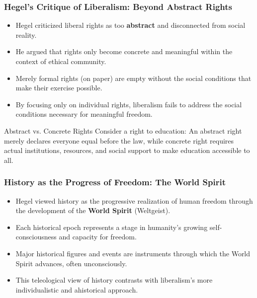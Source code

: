 \documentclass{beamer}
\begin{document}
\begin{frame}
\frametitle{Hegel's Critique of Liberalism: Beyond Abstract Rights}
\begin{itemize}
    \item Hegel criticized liberal rights as too \textbf{abstract} and disconnected from social reality.
    \item He argued that rights only become concrete and meaningful within the context of ethical community.
    \item Merely formal rights (on paper) are empty without the social conditions that make their exercise possible.
    \item By focusing only on individual rights, liberalism fails to address the social conditions necessary for meaningful freedom.
\end{itemize}

\begin{block}{Abstract vs. Concrete Rights}
Consider a right to education: An abstract right merely declares everyone equal before the law, while concrete right requires actual institutions, resources, and social support to make education accessible to all.
\end{block}
\end{frame}

\begin{frame}
\frametitle{History as the Progress of Freedom: The World Spirit}
\begin{itemize}
    \item Hegel viewed history as the progressive realization of human freedom through the development of the \textbf{World Spirit} (Weltgeist).
    \item Each historical epoch represents a stage in humanity's growing self-consciousness and capacity for freedom.
    \item Major historical figures and events are instruments through which the World Spirit advances, often unconsciously.
    \item This teleological view of history contrasts with liberalism's more individualistic and ahistorical approach.
\end{itemize}

\begin{center}
\end{center}
\end{frame}
\end{document}
